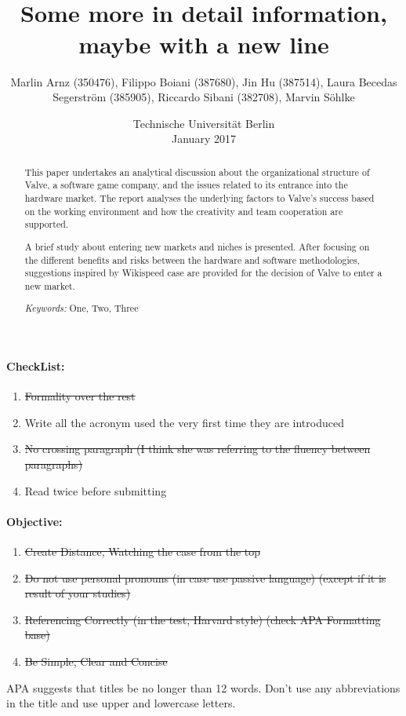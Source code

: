 \documentclass[12pt,twoside,notitle,a4paper]{article}
\title{\TITLES  \\
	\large Some more in detail information, \\
	maybe with a new line}
\author{Marlin Arnz (350476), Filippo Boiani (387680), Jin Hu (387514), Laura Becedas Segerström (385905), Riccardo Sibani (382708), Marvin Söhlke}
\date{ Technische Universität Berlin \\ January 2017}
\newenvironment{notation}{%
   \def\FrameCommand{\colorbox{yellow!20}}%
   \MakeFramed{\advance\hsize-\width \FrameRestore}}
 {\endMakeFramed}
\begin{document}
\maketitle


\thispagestyle{fancy}

\begin{notation}

\paragraph{CheckList:}
\begin{enumerate}
\item \st{Formality over the rest}
\item Write all the acronym used the very first time they are introduced
\item \st{No crossing paragraph (I think she was referring to the fluency between paragraphs)}
\item Read twice before submitting
\end{enumerate}

\paragraph{Objective:}
\begin{enumerate}
\item \st{Create Distance, Watching the case from the top}
\item \st{Do not use personal pronouns (in case use passive language) (except if it is result of your studies)}
\item \st{Referencing Correctly (in the test, Harvard style) (check APA Formatting base)}
\item \st{Be Simple, Clear and Concise}
\end{enumerate}

\end{notation}


\begin{notation}
	APA suggests that titles be no longer than 12 words. Don’t use any abbreviations in the title and use upper and lowercase letters.
	\end{notation}

\begin{abstract}
This paper undertakes an analytical discussion about the organizational structure of Valve, a software game company, and the issues related to its entrance into the hardware market. The report analyses the underlying factors to Valve's success based on the working environment and how the creativity and team cooperation are supported. 

A brief study about entering new markets and niches is presented. 
After focusing on the different benefits and risks between the hardware and software methodologies, suggestions inspired by Wikispeed case are provided for the decision of Valve to enter a new market.

\begin{center}
\textit{Keywords:} One, Two, Three
\end{center}

\end{abstract}
\end{document}

